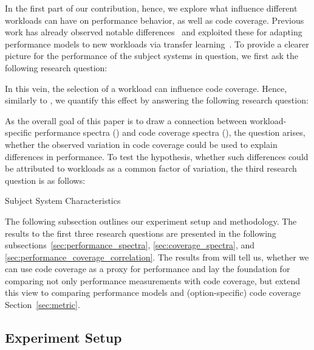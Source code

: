 In the first part of our contribution, hence, we explore what influence different workloads can have on performance behavior, as well as code coverage. Previous work has already observed notable differences~\cite{alves_sampling_2020,jamishidi_transfer_2017} and exploited these for adapting performance models to new workloads via transfer learning~\cite{jamshidi_transfer_gp_2017,jamshidi_learning_2018}. To provide a clearer picture for the performance of the subject systems in question, we first ask the following research question:


In this vein, the selection of a workload can influence code coverage. Hence, similarly to , we quantify this effect by answering the following research question:


As the overall goal of this paper is to draw a connection between workload-specific performance spectra () and code coverage spectra (), the question arises, whether the observed variation in code coverage could be used to explain differences in performance. To test the hypothesis, whether such differences could be attributed to workloads as a common factor of variation, the third research question is as follows: 


\begin{table*}[ht!]
	\centering
	\caption{Subject System Characteristics}
	
	\label{tab:subject_systems}
\end{table*}

The following subsection outlines our experiment setup and methodology. The results to the first three research questions are presented in the following subsections~\ref{sec:performance_spectra}, \ref{sec:coverage_spectra}, and \ref{sec:performance_coverage_correlation}. The results from  will tell us, whether we can use code coverage as a proxy for performance and lay the foundation for comparing not only performance measurements with code coverage, but extend this view to comparing performance models and (option-specific) code coverage Section~\ref{sec:metric}.

\subsection{Experiment Setup}

